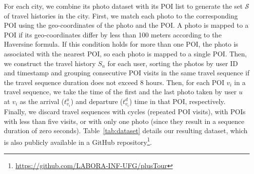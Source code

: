 For each city, we combine its photo dataset with its POI list to generate the set $\mathcal{S}$ of travel histories in the city. First, we match each photo to the corresponding POI using the geo-coordinates of the photo and the POI. A photo is mapped to a POI if its geo-coordinates differ by less than 100 meters according to the Haversine formula. If this condition holds for more than one POI, the photo is associated with the nearest POI, so each photo is mapped to a single POI. Then, we construct the travel history $S_u$ for each user, sorting the photos by user ID and timestamp and grouping consecutive POI visits in the same travel sequence if the travel sequence duration does not exceed 8 hours. Then, for each POI $v_i$ in a travel sequence, we take the time of the first and the last photo taken by user $u$ at $v_i$ as the arrival ($t_{v_i}^a$) and departure ($t_{v_i}^d$) time in that POI, respectively. Finally, we discard travel sequences with cycles (repeated POI visits), with POIs with less than five visits, or with only one photo (since they result in a sequence duration of zero seconds). Table~\ref{tab:dataset} details our resulting dataset, which is also publicly available in a GitHub repository\footnote{\url{https://github.com/LABORA-INF-UFG/plusTour}}.

